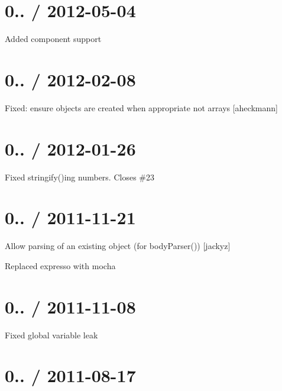 \section*{0.. / 2012-\/05-\/04 }


\begin{DoxyItemize}
\item Added component support
\end{DoxyItemize}

\section*{0.. / 2012-\/02-\/08 }


\begin{DoxyItemize}
\item Fixed\+: ensure objects are created when appropriate not arrays \mbox{[}aheckmann\mbox{]}
\end{DoxyItemize}

\section*{0.. / 2012-\/01-\/26 }


\begin{DoxyItemize}
\item Fixed stringify()ing numbers. Closes \#23
\end{DoxyItemize}

\section*{0.. / 2011-\/11-\/21 }


\begin{DoxyItemize}
\item Allow parsing of an existing object (for {\ttfamily body\+Parser()}) \mbox{[}jackyz\mbox{]}
\item Replaced expresso with mocha
\end{DoxyItemize}

\section*{0.. / 2011-\/11-\/08 }


\begin{DoxyItemize}
\item Fixed global variable leak
\end{DoxyItemize}

\section*{0.. / 2011-\/08-\/17 }


